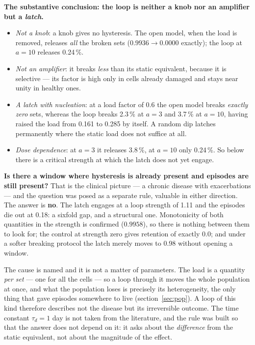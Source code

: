 \textbf{The substantive conclusion: the loop is neither a knob nor an amplifier but a \emph{latch}.}
\begin{itemize}
\item \emph{Not a knob}: a knob gives no hysteresis. The open model, when the load is removed, releases \emph{all} the broken sets ($0.9936\to0.0000$ exactly); the loop at $a=10$ releases 0.24\,\%.
\item \emph{Not an amplifier}: it breaks \emph{less} than its static equivalent, because it is selective --- its factor is high only in cells already damaged and stays near unity in healthy ones.
\item \emph{A latch with nucleation}: at a load factor of 0.6 the open model breaks \emph{exactly zero} sets, whereas the loop breaks 2.3\,\% at $a=3$ and 3.7\,\% at $a=10$, having raised the load from 0.161 to 0.285 by itself. A random dip latches permanently where the static load does not suffice at all.
\item \emph{Dose dependence}: at $a=3$ it releases 3.8\,\%, at $a=10$ only 0.24\,\%. So below there is a critical strength at which the latch does not yet engage.
\end{itemize}

\textbf{Is there a window where hysteresis is already present and episodes are still present?} That is the clinical picture --- a chronic disease with exacerbations --- and the question was posed as a separate rule, valuable in either direction. The answer is \textbf{no}. The latch engages at a loop strength of 1.11 and the episodes die out at 0.18: a sixfold gap, and a structural one. Monotonicity of both quantities in the strength is confirmed ($0.9958$), so there is nothing between them to look for; the control at strength zero gives retention of exactly 0.0; and under a softer breaking protocol the latch merely moves to 0.98 without opening a window.

\begin{ineq}
The cause is named and it is not a matter of parameters. The load is a quantity \emph{per set} --- one for all the cells --- so a loop through it moves the whole population at once, and what the population loses is precisely its heterogeneity, the only thing that gave episodes somewhere to live (section~\ref{sec:pop}). A loop of this kind therefore describes not the disease but its irreversible outcome. The time constant $\tau_d=1$ day is not taken from the literature, and the rule was built so that the answer does not depend on it: it asks about the \emph{difference} from the static equivalent, not about the magnitude of the effect.
\end{ineq}
